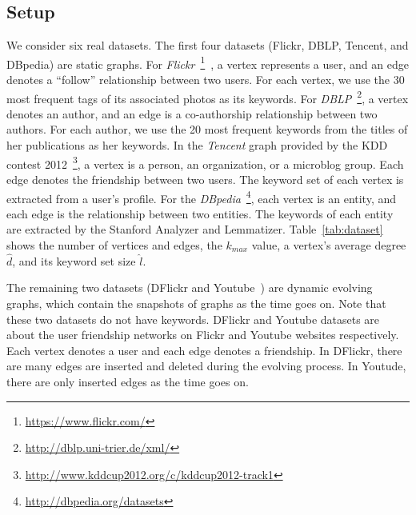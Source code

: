 \subsection{Setup}
\label{setup}

We consider six real datasets. The first four datasets (Flickr, DBLP, Tencent, and DBpedia) are static graphs.
For {\it Flickr}~\footnote{\url{https://www.flickr.com/}}~\cite{thomee2015new}, a vertex represents a user, and an edge denotes a ``follow'' relationship between two users. For each vertex, we use the 30 most frequent tags of its associated photos as its keywords.
For {\it DBLP}~\footnote{\url{http://dblp.uni-trier.de/xml/}}, a vertex denotes an author, and an edge is a co-authorship relationship between two authors.
For each author, we use the 20 most frequent keywords from the titles of her publications as her keywords.
In the {\it Tencent} graph provided by the KDD contest 2012~\footnote{\url{http://www.kddcup2012.org/c/kddcup2012-track1}}, a vertex is a person, an organization, or a microblog group. Each edge denotes the friendship between two users. The keyword set of each vertex is extracted from a user's profile. For the {\it DBpedia}~\footnote{\url{http://dbpedia.org/datasets}}, each vertex is an entity, and each edge is the relationship between two entities. The keywords of each entity are extracted by the Stanford Analyzer and Lemmatizer.
Table~\ref{tab:dataset} shows the number of vertices and edges, the $k_{max}$ value, a vertex's average degree $\widehat d$, and its keyword set size $\widehat l$.

{\color{blue}
The remaining two datasets (DFlickr and Youtube~\cite{mislove-2009-socialnetworksthesis,mislove-2008-flickr}) are dynamic evolving graphs, which contain the snapshots of graphs as the time goes on.
Note that these two datasets do not have keywords.
DFlickr and Youtube datasets are about the user friendship networks on Flickr and Youtube websites respectively.
Each vertex denotes a user and each edge denotes a friendship.
In DFlickr, there are many edges are inserted and deleted during the evolving process.
In Youtude, there are only inserted edges as the time goes on.
}

